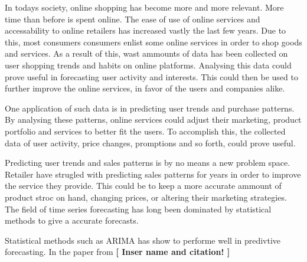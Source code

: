 


In todays society, online shopping has become more and more relevant.
More time than before is spent online.
The ease of use of online services and accessability to online retailers has increased vastly the last few years.
Due to this, most consumers consumers enlist some online services in order to shop goods and services.
As a result of this, wast ammounts of data has been collected on user shopping trends and habits on online platforms.
Analysing this data could prove useful in forecasting user activity and interests.
This could then be used to further improve the online services, in favor of the users and companies alike.

One application of such data is in predicting user trends and purchase patterns.
By analysing these patterns, online services could adjust their marketing, product portfolio and services to better fit the users.
To accomplish this, the collected data of user activity, price changes, promptions and so forth, could prove useful.










Predicting user trends and sales patterns is by no means a new problem space.
Retailer have strugled with predicting sales patterns for years in order to improve the service they provide.
This could be to keep a more accurate ammount of product stroc on hand, changing prices, or altering their marketing strategies.
The field of time series forecasting has long been dominated by statistical methods to give a accurate forecasts.


Statistical methods such as ARIMA has show to performe well in predivtive forecasting.
In the paper from \textbf{[ Inser name and citation! ]} 


